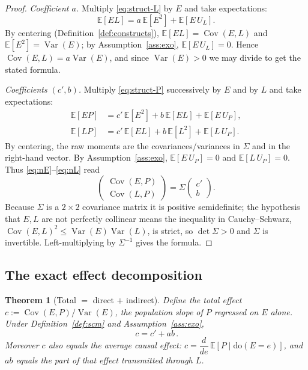 \documentclass{amsart}
\newtheorem{theorem}{Theorem}
\theoremstyle{definition}
\begin{document}
\begin{proof}
\emph{Coefficient $a$.} Multiply \eqref{eq:struct-L} by $E$ and take
expectations:
\[
\mathbb E[EL]=a\,\mathbb E[E^2]+\mathbb E[E\,U_L].
\]
By centering (Definition~\ref{def:constructs}), $\mathbb E[EL]=\operatorname{Cov}(E,L)$
and $\mathbb E[E^2]=\operatorname{Var}(E)$; by Assumption~\ref{ass:exo},
$\mathbb E[E\,U_L]=0$. Hence $\operatorname{Cov}(E,L)=a\operatorname{Var}(E)$, and
since $\operatorname{Var}(E)>0$ we may divide to get the stated formula.

\emph{Coefficients $(c',b)$.} Multiply \eqref{eq:struct-P} successively by $E$
and by $L$ and take expectations:
\begin{align}
\mathbb E[EP]&=c'\,\mathbb E[E^2]+b\,\mathbb E[EL]+\mathbb E[E\,U_P],\label{eq:nE}\\
\mathbb E[LP]&=c'\,\mathbb E[EL]+b\,\mathbb E[L^2]+\mathbb E[L\,U_P].\label{eq:nL}
\end{align}
By centering, the raw moments are the covariances/variances in $\Sigma$ and in
the right-hand vector. By Assumption~\ref{ass:exo}, $\mathbb E[E\,U_P]=0$ and
$\mathbb E[L\,U_P]=0$. Thus \eqref{eq:nE}--\eqref{eq:nL} read
\[
\begin{pmatrix}\operatorname{Cov}(E,P)\\ \operatorname{Cov}(L,P)\end{pmatrix}
=\Sigma\begin{pmatrix}c'\\ b\end{pmatrix}.
\]
Because $\Sigma$ is a $2\times2$ covariance matrix it is positive
semidefinite; the hypothesis that $E,L$ are not perfectly collinear means the
inequality in Cauchy--Schwarz,
$\operatorname{Cov}(E,L)^2\le\operatorname{Var}(E)\operatorname{Var}(L)$, is
strict, so $\det\Sigma>0$ and $\Sigma$ is invertible. Left-multiplying by
$\Sigma^{-1}$ gives the formula.
\end{proof}

\subsection{The exact effect decomposition}

\begin{theorem}[Total $=$ direct $+$ indirect]\label{thm:decomp}
Define the total effect $c:=\operatorname{Cov}(E,P)/\operatorname{Var}(E)$, the
population slope of $P$ regressed on $E$ alone. Under
Definition~\ref{def:scm} and Assumption~\ref{ass:exo},
\begin{equation}\label{eq:decomp}
\boxed{\,c=c'+ab\,}.
\end{equation}
Moreover $c$ also equals the average causal effect:
$c=\dfrac{d}{de}\,\mathbb E[P\mid \mathrm{do}(E=e)]$, and $ab$ equals the part
of that effect transmitted through $L$.
\end{theorem}
\end{document}
